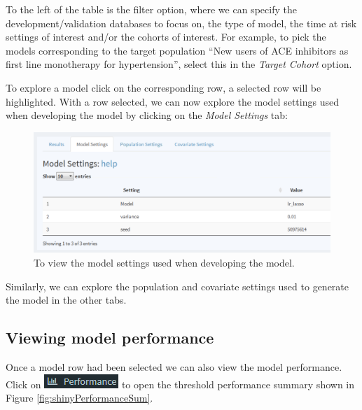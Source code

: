 \documentclass[11pt]{book}
\theoremstyle{definition}
\theoremstyle{definition}
\theoremstyle{definition}
\theoremstyle{remark}
\begin{document}
To the left of the table is the filter option, where we can specify the development/validation databases to focus on, the type of model, the time at risk settings of interest and/or the cohorts of interest. For example, to pick the models corresponding to the target population ``New users of ACE inhibitors as first line monotherapy for hypertension'', select this in the \emph{Target Cohort} option.

To explore a model click on the corresponding row, a selected row will be highlighted. With a row selected, we can now explore the model settings used when developing the model by clicking on the \emph{Model Settings} tab:

\begin{figure}

{\centering \includegraphics[width=1\linewidth]{images/PatientLevelPrediction/shiny/shinyModel} 

}

\caption{To view the model settings used when developing the model.}\label{fig:shinyModel}
\end{figure}

Similarly, we can explore the population and covariate settings used to generate the model in the other tabs.

\hypertarget{viewing-model-performance}{%
\subsection{Viewing model performance}\label{viewing-model-performance}}

Once a model row had been selected we can also view the model performance. Click on \includegraphics{images/PatientLevelPrediction/performance.png} to open the threshold performance summary shown in Figure \ref{fig:shinyPerformanceSum}.
\end{document}
